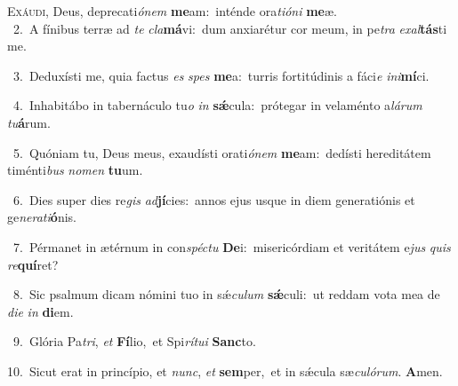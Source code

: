 \lettrine{\initial\textcolor{\initialcolor}{E}}{xáudi,} Deus, deprecati\-\textit{ó}\-\textit{nem} \textbf{me}\-am:~\star inténde ora\-\textit{ti}\-\textit{ó}\textit{ni} \textbf{me}\-æ.\\
{\numbfont\textcolor{\numbcolor}{~2.}}~A fínibus terræ ad \textit{te} \textit{cla}\-\textbf{má}vi:~\star dum anxiarétur cor meum, in pe\textit{tra} \textit{ex}\-\textit{al}\textbf{tás}ti me.\par
{\numbfont\textcolor{\numbcolor}{~3.}}~Deduxísti me, quia factus \textit{es} \textit{spes} \textbf{me}\-a:~\star turris fortitúdinis a fáci\textit{e} \textit{in}\-\textit{i}\textbf{mí}ci.\par
{\numbfont\textcolor{\numbcolor}{~4.}}~Inhabitábo in tabernáculo tu\textit{o} \textit{in} \textbf{sǽ}\-cula:~\star prótegar in velaménto a\-\textit{lá}\-\textit{rum} \textit{tu}\-\textbf{á}rum.\par
{\numbfont\textcolor{\numbcolor}{~5.}}~Quóniam tu, Deus meus, exaudísti orati\-\textit{ó}\-\textit{nem} \textbf{me}\-am:~\star dedísti hereditátem timénti\textit{bus} \textit{no}\-\textit{men} \textbf{tu}\-um.\par
{\numbfont\textcolor{\numbcolor}{~6.}}~Dies super dies re\textit{gis} \textit{ad}\-\textbf{jí}cies:~\star annos ejus usque in diem generatiónis et ge\-\textit{ne}\-\textit{ra}\textit{ti}\textbf{ó}nis.\par
{\numbfont\textcolor{\numbcolor}{~7.}}~Pérmanet in ætérnum in con\-\textit{spéc}\-\textit{tu} \textbf{De}\-i:~\star misericórdiam et veritátem e\textit{jus} \textit{quis} \textit{re}\-\textbf{quí}ret?\par
{\numbfont\textcolor{\numbcolor}{~8.}}~Sic psalmum dicam nómini tuo in sǽ\-\textit{cu}\-\textit{lum} \textbf{sǽ}\-culi:~\star ut reddam vota mea de \textit{di}\-\textit{e} \textit{in} \textbf{di}\-em.\par
{\numbfont\textcolor{\numbcolor}{~9.}}~Glória Pa\-\textit{tri}\-, \textit{et} \textbf{Fí}\-lio,~\star et Spi\-\textit{rí}\-\textit{tu}\textit{i} \textbf{Sanc}\-to.\par
{\numbfont\textcolor{\numbcolor}{10.}}~Sicut erat in princípio, et \textit{nunc}\-, \textit{et} \textbf{sem}\-per,~\star et in sǽcula sæ\-\textit{cu}\-\textit{ló}\textit{rum}. \textbf{A}\-men.\par
